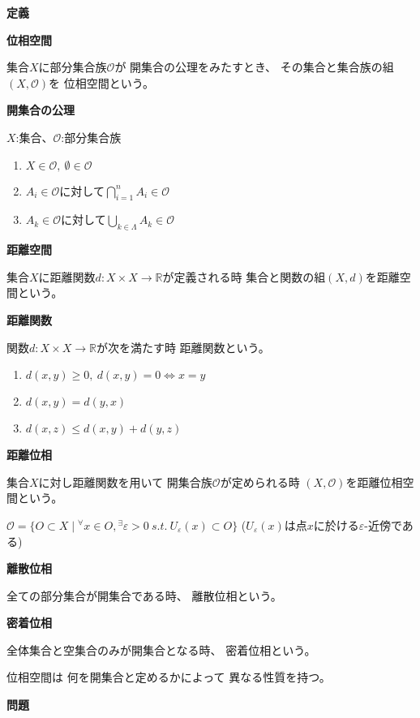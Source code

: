 \documentclass[12pt,b5paper]{ltjsarticle}
\begin{document}
\hrulefill
\textbf{定義}
\hrulefill

\textbf{位相空間}

集合$X$に部分集合族$\mathcal{O}$が
開集合の公理をみたすとき、
その集合と集合族の組$(X,\mathcal{O})$を
位相空間という。

\textbf{開集合の公理}

$X$:集合、$\mathcal{O}$:部分集合族
\begin{enumerate}
 \item $X\in\mathcal{O},\ \emptyset\in\mathcal{O}$
 \item $A_i\in\mathcal{O}$に対して$\bigcap_{i=1}^{n}A_i\in\mathcal{O}$
 \item $A_k\in\mathcal{O}$に対して$\bigcup_{k\in\Lambda}A_k\in\mathcal{O}$
\end{enumerate}

\textbf{距離空間}

集合$X$に距離関数$d:X\times X \to \mathbb{R}$が定義される時
集合と関数の組$(X,d)$を距離空間という。

\textbf{距離関数}

関数$d:X\times X \to \mathbb{R}$が次を満たす時
距離関数という。
\begin{enumerate}
 \item $d(x,y)\geq 0,\ d(x,y)=0 \Leftrightarrow x=y$
 \item $d(x,y)=d(y,x)$
 \item $d(x,z)\leq d(x,y)+d(y,z)$
\end{enumerate}

\textbf{距離位相}

集合$X$に対し距離関数を用いて
開集合族$\mathcal{O}$が定められる時
$(X,\mathcal{O})$を距離位相空間という。

$\mathcal{O}=\{ O\subset X \mid
 {}^{\forall}x\in O, {}^{\exists}\varepsilon>0
 \ s.t.\ U_{\varepsilon}(x)\subset O
 \}$
 ($U_{\varepsilon}(x)$は点$x$に於ける$\varepsilon$-近傍である)



\textbf{離散位相}

全ての部分集合が開集合である時、
離散位相という。

\textbf{密着位相}

全体集合と空集合のみが開集合となる時、
密着位相という。


\dotfill

位相空間は
何を開集合と定めるかによって
異なる性質を持つ。




\hrulefill
\textbf{問題}
\hrulefill
\end{document}
